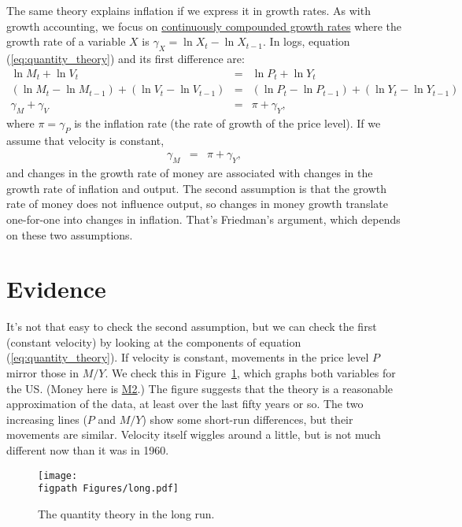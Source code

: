 The same theory explains inflation if we express it in growth rates.
As with growth accounting, we focus on \hyperref[sec:growth_math_cc]{continuously compounded growth rates} where the growth rate of a variable $X$ is
$ \gamma_X = \ln X_t - \ln X_{t-1}$.
In logs, equation (\ref{eq:quantity_theory}) and its first difference are:
%
\begin{eqnarray*}
    \ln M_t + \ln V_t &=& \ln P_t + \ln Y_t \\
    (\ln M_t - \ln M_{t-1})  + (\ln V_t - \ln V_{t-1})
                 &=& (\ln P_t - \ln P_{t-1}) + (\ln Y_t - \ln Y_{t-1})\\
    \gamma_M  + \gamma_V &=&  \pi + \gamma_Y ,
\end{eqnarray*}
%
where $\pi = \gamma_P $ is the inflation rate
(the rate of growth of the price level).
If we assume that velocity is constant,
\begin{eqnarray}
    \gamma_M   &=&  \pi + \gamma_Y ,
    \label{eq:quantity_theory-growth}
\end{eqnarray}
and changes in the growth rate of money are associated
with changes in the growth rate of inflation and output.
The second assumption is that the growth rate of money does not influence
output, so changes in money growth translate one-for-one
into changes in inflation.
That's Friedman's argument, which depends on these two assumptions.


\section{Evidence}

It's not that easy to check the second assumption, but we can
check the first (constant velocity) by looking at the components of
equation (\ref{eq:quantity_theory}).
If velocity is constant, movements in the price
level $P$ mirror those in $M/Y$.
We check this in Figure~\ref{fig:quantity_long}, which graphs
both variables for the US.
(Money here is \href{http://research.stlouisfed.org/fred2/series/M2}{M2}.)
The figure suggests that the theory is a reasonable approximation of the data, at least
over the last fifty years or so.
The two increasing lines ($P$ and $M/Y$)
show some short-run differences, but their movements are similar.
Velocity itself wiggles around a little, but is not
much different now than it was in 1960.
%
\begin{figure}[h]
    \caption{The quantity theory in the long run.}
    \label{fig:quantity_long}
    \centering
    \texttt{[image: \\figpath Figures/long.pdf]}
\end{figure}
%

